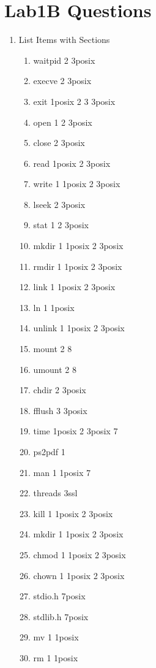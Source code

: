 \documentclass[12pt]{extarticle}
\begin{document}
	\section*{Lab1B Questions}
		\begin{enumerate}
			\item List Items with Sections
			\begin{multicols}{3}
				 \begin{enumerate}fork 2 3posix 
					\item[] waitpid 2 3posix 
					\item[] execve 2 3posix 
					\item[] exit 1posix 2 3 3posix 
					\item[] open 1 2 3posix 
					\item[] close 2 3posix 
					\item[] read 1posix 2 3posix 
					\item[] write 1 1posix 2 3posix 
					\item[] lseek 2 3posix 
					\item[] stat 1 2 3posix 
					\item[] mkdir 1 1posix 2 3posix 
					\item[] rmdir 1 1posix 2 3posix 
					\item[] link 1 1posix 2 3posix 
					\item[] ln 1 1posix 
					\item[] unlink 1 1posix 2 3posix 
					\item[] mount 2 8 
					\item[] umount 2 8 
					\item[] chdir 2 3posix 
					\item[] fflush 3 3posix 
					\item[] time 1posix 2 3posix 7 
					\item[] ps2pdf 1 
					\item[] man 1 1posix 7 
					\item[] threads 3ssl 
					\item[] kill 1 1posix 2 3posix 
					\item[] mkdir 1 1posix 2 3posix 
					\item[] chmod 1 1posix 2 3posix 
					\item[] chown 1 1posix 2 3posix 
					\item[] stdio.h 7posix 
					\item[] stdlib.h 7posix 
					\item[] mv 1 1posix 
					\item[] rm 1 1posix 

\end{enumerate}
\end{multicols}
\end{enumerate}
\end{document}
